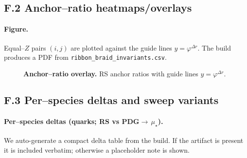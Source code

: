 \documentclass[epjc3]{svjour3}
\begin{document}
\subsection*{F.2 Anchor–ratio heatmaps/overlays}
\paragraph{Figure.}
Equal–$Z$ pairs $(i,j)$ are plotted against the guide lines $y=\varphi^{\Delta r}$. The build produces a PDF from \texttt{ribbon\_braid\_invariants.csv}.
\begin{figure}[h]
  \centering
  \caption{\textbf{Anchor–ratio overlay.} RS anchor ratios with guide lines $y=\varphi^{\Delta r}$.}
\end{figure}

\subsection*{F.3 Per–species deltas and sweep variants}
\paragraph{Per–species deltas (quarks; RS vs PDG$\to\,\mu_\star$).}
We auto-generate a compact delta table from the build. If the artifact is present it is included verbatim; otherwise a placeholder note is shown.
\end{document}
